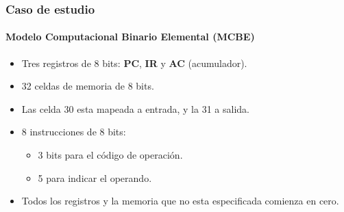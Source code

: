 \documentclass[11pt,a4paper,spanish]{beamer}
\begin{document}
\begin{frame}
    \frametitle{Caso de estudio}
    \framesubtitle{Modelo Computacional Binario Elemental (MCBE)}
    \begin{itemize}
        \item Tres registros de 8 bits: \textbf{PC}, \textbf{IR} y \textbf{AC}
            (acumulador).
        \item 32 celdas de memoria de 8 bits.
        \item Las celda 30 esta mapeada a entrada, y la 31 a salida.
        \item 8 instrucciones de 8 bits:
            \begin{itemize}
                \item 3 bits para el código de operación.
                \item 5 para indicar el operando.
            \end{itemize}
        \item Todos los registros y la memoria que no esta especificada
            comienza en cero.
    \end{itemize}
\end{frame}
\end{document}
